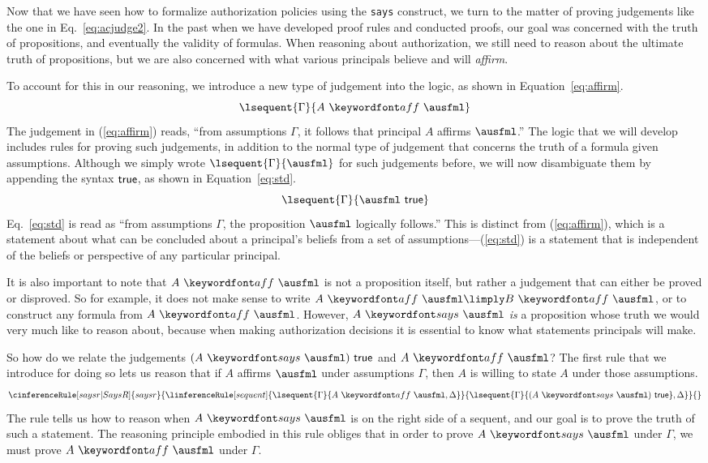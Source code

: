 \documentclass[11pt,twoside]{scrartcl}
\begin{document}
Now that we have seen how to formalize authorization policies using the \verb'says' construct, we turn to the matter of proving judgements like the one in Eq.~\ref{eq:acjudge2}. In the past when we have developed proof rules and conducted proofs, our goal was concerned with the truth of propositions, and eventually the validity of formulas. When reasoning about authorization, we still need to reason about the ultimate truth of propositions, but we are also concerned with what various principals believe and will \emph{affirm}.

To account for this in our reasoning, we introduce a new type of judgement into the logic, as shown in Equation~\ref{eq:affirm}.
\begin{equation}
\label{eq:affirm}
\lsequent{\Gamma}{\aff{A}{\ausfml}}
\end{equation}
The judgement in (\ref{eq:affirm}) reads, ``from assumptions $\Gamma$, it follows that principal $A$ affirms $\ausfml$.'' The logic that we will develop includes rules for proving such judgements, in addition to the normal type of judgement that concerns the truth of a formula given assumptions. Although we simply wrote $\lsequent{\Gamma}{\ausfml}$ for such judgements before, we will now disambiguate them by appending the syntax $\mathsf{true}$, as shown in Equation~\ref{eq:std}.
\begin{equation}
\label{eq:std}
\lsequent{\Gamma}{\ausfml~\strue}
\end{equation}
Eq.~\ref{eq:std} is read as ``from assumptions $\Gamma$, the proposition $\ausfml$ logically follows.'' This is distinct from (\ref{eq:affirm}), which is a statement about what can be concluded about a principal's beliefs from a set of assumptions---(\ref{eq:std}) is a statement that is independent of the beliefs or perspective of any particular principal.

It is also important to note that $\aff{A}{\ausfml}$ is not a proposition itself, but rather a judgement that can either be proved or disproved. So for example, it does not make sense to write $\aff{A}{\ausfml} \limply \aff{B}{\ausfml}$, or to construct any formula from $\aff{A}{\ausfml}$. However, $\says{A}{\ausfml}$ \emph{is} a proposition whose truth we would very much like to reason about, because when making authorization decisions it is essential to know what statements principals will make.

So how do we relate the judgements $(\says{A}{\ausfml})~\strue$ and $\aff{A}{\ausfml}$? The first rule  that we introduce for doing so lets us reason that if $A$ affirms $\ausfml$ under assumptions $\Gamma$, then $A$ is willing to state $A$ under those assumptions.
\[
\cinferenceRule[saysr|SaysR]{saysr}
{\linferenceRule[sequent]
  {
    \lsequent{\Gamma}{\aff{A}{\ausfml},\Delta}
  }
  {\lsequent{\Gamma}{(\says{A}{\ausfml})~\strue},\Delta}
}{}%
\]
The rule  tells us how to reason when $\says{A}{\ausfml}$ is on the right side of a sequent, and our goal is to prove the truth of such a statement. The reasoning principle embodied in this rule obliges that in order to prove $\says{A}{\ausfml}$ under $\Gamma$, we must prove $\aff{A}{\ausfml}$ under $\Gamma$.
\end{document}
